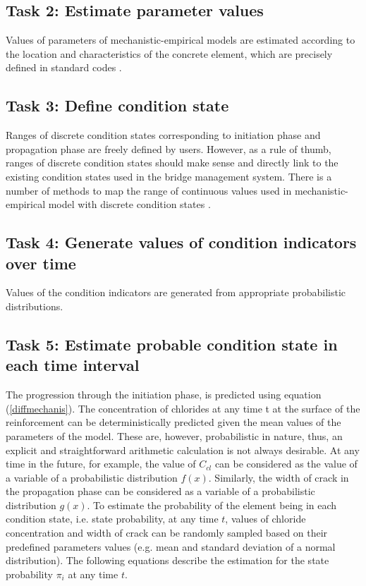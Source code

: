 \documentclass[Journal]{ascelike}
\begin{document}
\subsection{Task 2: Estimate parameter values}

Values of parameters of mechanistic-empirical models are estimated
according to the location and characteristics of the concrete element,
which are precisely defined in standard codes \cite{DuraCrete2000,DuraCrete1998}. 

\subsection{Task 3: Define condition state}

Ranges of discrete condition states corresponding to initiation phase
and propagation phase are freely defined by users. However, as a
rule of thumb, ranges of discrete condition states should make sense
and directly link to the existing condition states used in the bridge
management system. There is a number of methods to map the range of
continuous values used in mechanistic-empirical model with discrete
condition states \cite{Roelfstra2004}. 

\subsection{Task 4: Generate values of condition indicators over time}

Values of the condition indicators are generated from appropriate
probabilistic distributions. 

\subsection{Task 5: Estimate probable condition state in each time interval}

The progression through the initiation phase, is predicted using equation
(\ref{diffmechanis}). The concentration of chlorides at any time
t at the surface of the reinforcement can be deterministically predicted
given the mean values of the parameters of the model. These are, however,
probabilistic in nature, thus, an explicit and straightforward arithmetic
calculation is not always desirable. At any time in the future, for
example, the value of $C_{cl}$ can be considered as the value of
a variable of a probabilistic distribution $f(x)$. Similarly, the
width of crack in the propagation phase can be considered as a variable
of a probabilistic distribution $g(x)$. To estimate the probability
of the element being in each condition state, i.e. state probability,
at any time $t$, values of chloride concentration and width of crack
can be randomly sampled based on their predefined parameters values
(e.g. mean and standard deviation of a normal distribution). The following
equations describe the estimation for the state probability $\pi_{i}$
at any time $t$.
\end{document}
